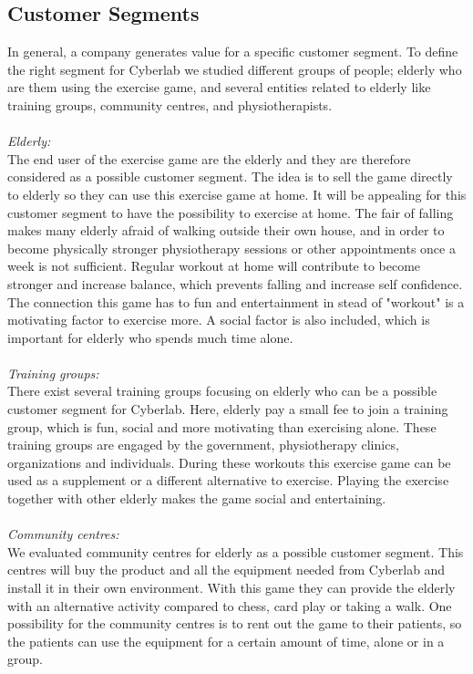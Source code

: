 \subsection{Customer Segments}
In general, a company generates value for a specific customer segment. To define the right segment for Cyberlab we studied different groups of people; elderly who are them using the exercise game, and several entities related to elderly like training groups, community centres, and physiotherapists.\\ \\ 
\emph{Elderly:}\\ 
The end user of the exercise game are the elderly and they are therefore considered as a possible customer segment. The idea is to sell the game directly to elderly so they can use this exercise game at home. It will be  appealing for this customer segment to have the possibility to exercise at home. The fair of falling makes many elderly afraid of walking outside their own house, and in order to become physically stronger physiotherapy sessions or other appointments once a week is not sufficient. Regular workout at home will contribute to become stronger and increase balance, which prevents falling and increase self confidence. The connection this game has to fun and entertainment in stead of "workout" is a motivating factor to exercise more. A social factor is also included, which is important for elderly who spends much time alone. \\ \\
\emph{Training groups:}\\ 
There exist several training groups focusing on elderly who can be a possible customer segment for Cyberlab. Here, elderly pay a small fee to join a training group, which is fun, social and more motivating than exercising alone. These training groups are engaged by the government, physiotherapy clinics, organizations and individuals. During these workouts this exercise game can be used as a supplement or a different alternative to exercise. Playing the exercise together with other elderly makes the game social and entertaining. \\ \\
\emph{Community centres:} \\
We evaluated community centres for elderly as a possible customer segment. This centres will buy the product and all the equipment needed from Cyberlab and install it in their own environment. With this game they can provide the elderly with an alternative activity compared to chess, card play or taking a walk. One possibility for the community centres is to rent out the game to their patients, so the patients can use the equipment for a certain amount of time, alone or in a group. \\ \\

